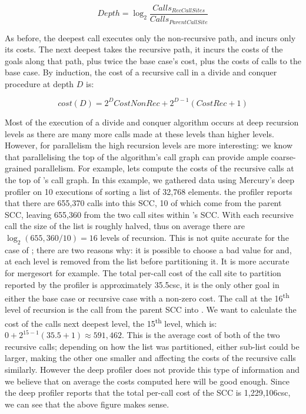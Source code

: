 \begin{equation*}
Depth = \log_2 \frac{Calls_{RecCallSites}}{Calls_{ParentCallSite}}
\end{equation*}

As before, the deepest call executes only the non-recursive path,
and incurs only its costs.
The next deepest takes the recursive path,
it incurs the costs of the goals along that path,
plus twice the base case's cost, plus the costs of calls to the base case.
By induction,
the cost of a recursive call in a divide and conquer procedure at depth $D$ is:

\begin{equation*}
cost(D) = 2^D{CostNonRec} + 2^{D-1}(CostRec + 1)
\end{equation*}

Most of the execution of a divide and conquer algorithm occurs at deep
recursion levels as there are many more calls made at these levels than higher
levels.
However, for parallelism the high recursion levels are more interesting:
we know that parallelising the top of the algorithm's call graph can provide
ample coarse-grained parallelism.
For example, lets compute the costs of the recursive calls at the top of
\quicksortacc's call graph.
In this example, we gathered data using Mercury's deep profiler on 10
executions of \quicksortacc sorting a list of 32,768 elements.
the profiler reports that there are 655,370 calls into this SCC,
10 of which come from the parent SCC, leaving 655,360 from the two call sites
within \quicksortacc's SCC.
With each recursive call the size of the list is roughly halved,
thus on average there are $\log_{2}(655,360/10) = 16$ levels of recursion.
This is not quite accurate for the case of \quicksortacc;
there are two reasons why:
it is possible to choose a bad value for  and,
at each level  is removed from the list before partitioning it.
It is more accurate for mergesort for example.
The total per-call cost of the call site to partition reported by the profiler
is approximately 35.5csc,
it is the only other goal in either the base case or recursive case with a
non-zero cost.
The call at the 16\textsuperscript{th} level of recursion is the call from the
parent SCC into \quicksortacc.
We want to calculate the cost of the calls next deepest level, the
15\textsuperscript{th} level, which is:
$0 + 2^{15 - 1}(35.5 + 1) \approx 591,462$.
This is the average cost of both of the two recursive calls;
depending on how the list was partitioned,
either sub-list could be larger, making the other one
smaller and affecting the costs of the recursive calls similarly.
However the deep profiler does not provide this type of information and we
believe that on average the costs computed here will be good enough.
Since the deep profiler reports that the total per-call cost of the
\quicksortacc SCC is 1,229,106csc, we can see that the above figure makes
sense.

